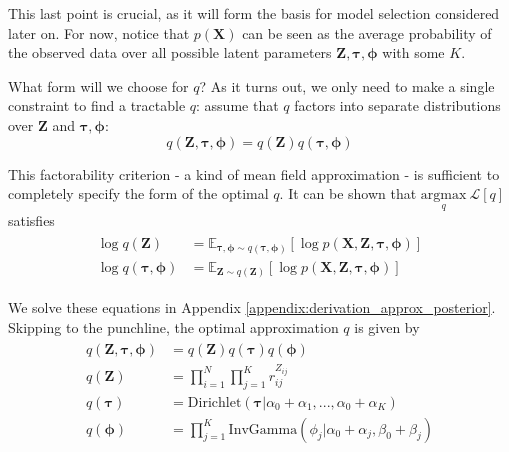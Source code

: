 \documentclass{article}
\let\vec\boldsymbol
\begin{document}
This last point is crucial, as it will form the basis for model selection considered later on. For now, notice that $p(\vec{X})$ can be seen as the average probability of the observed data over all possible latent parameters $\vec{Z}, \boldsymbol{\tau}, \boldsymbol{\phi}$ with some $K$. \newline

What form will we choose for $q$? As it turns out, we only need to make a
single constraint to find a tractable $q$: assume that $q$ factors into
separate distributions over $\vec{Z}$ and $\boldsymbol{\tau}, \boldsymbol{\phi}$:
\[
    q \left( \vec{Z}, \boldsymbol{\tau}, \boldsymbol{\phi} \right) = q \left( \vec{Z} \right) q \left( \boldsymbol{\tau}, \boldsymbol{\phi} \right)
\]

This factorability criterion - a kind of mean field approximation - is sufficient
to completely specify the form of the optimal $q$. It can be shown \cite{bishop2006}
that $\underset{q}{\text{argmax}} \: \mathcal{L}[q]$ satisfies
\begin{align}\begin{split}\label{eq:em_equations}
    \log q \left( \vec{Z} \right) &= \mathbb{E}_{\boldsymbol{\tau}, \boldsymbol{\phi} \sim q (\boldsymbol{\tau}, \boldsymbol{\phi})} \left[ \log p \left( \vec{X}, \vec{Z}, \boldsymbol{\tau}, \boldsymbol{\phi} \right) \right] \\
    \log q \left( \boldsymbol{\tau}, \boldsymbol{\phi} \right) &= \mathbb{E}_{\vec{Z} \sim q(\vec{Z})} \left[ \log p \left( \vec{X}, \vec{Z}, \boldsymbol{\tau}, \boldsymbol{\phi} \right) \right]
\end{split}\end{align}

We solve these equations in Appendix \ref{appendix:derivation_approx_posterior}.
Skipping to the punchline, the optimal approximation $q$ is given by
\begin{align}\begin{split}
    q \left( \vec{Z}, \boldsymbol{\tau}, \boldsymbol{\phi} \right) &= q \left( \vec{Z} \right) q \left( \boldsymbol{\tau} \right) q \left( \boldsymbol{\phi} \right) \\
    q \left( \vec{Z} \right) &= \prod\limits_{i=1}^{N} \prod\limits_{j=1}^{K} r_{ij}^{Z_{ij}} \\
    q \left( \boldsymbol{\tau} \right) &= \text{Dirichlet} \left(
        \boldsymbol{\tau} | \alpha_{0} + \alpha_{1}, ..., \alpha_{0} + \alpha_{K}
    \right) \\
    q \left( \boldsymbol{\phi} \right) &= \prod\limits_{j=1}^{K} \text{InvGamma} \left(
        \phi_{j} | \alpha_{0} + \alpha_{j}, \beta_{0} + \beta_{j}
    \right)
\end{split}\end{align}
\end{document}

